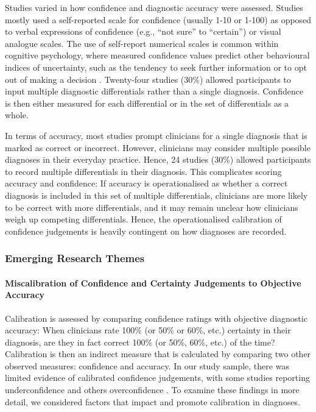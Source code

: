 \documentclass[a4paper, nobind]{templates/ociamthesis}
\begin{document}
\hfill\break
Studies varied in how confidence and diagnostic accuracy were assessed. Studies mostly used a self-reported scale for confidence (usually 1-10 or 1-100) as opposed to verbal expressions of confidence (e.g., ``not sure'' to ``certain'') or visual analogue scales. The use of self-report numerical scales is common within cognitive psychology, where measured confidence values predict other behavioural indices of uncertainty, such as the tendency to seek further information or to opt out of making a decision \autocite{gherman_neural_2015}. Twenty-four studies (30\%) allowed participants to input multiple diagnostic differentials rather than a single diagnosis. Confidence is then either measured for each differential or in the set of differentials as a whole.

\hfill\break
In terms of accuracy, most studies prompt clinicians for a single diagnosis that is marked as correct or incorrect. However, clinicians may consider multiple possible diagnoses in their everyday practice. Hence, 24 studies (30\%) allowed participants to record multiple differentials in their diagnosis. This complicates scoring accuracy and confidence: If accuracy is operationalised as whether a correct diagnosis is included in this set of multiple differentials, clinicians are more likely to be correct with more differentials, and it may remain unclear how clinicians weigh up competing differentials. Hence, the operationalised calibration of confidence judgements is heavily contingent on how diagnoses are recorded.

\subsubsection{Emerging Research Themes}\label{emerging-research-themes}

\paragraph{Miscalibration of Confidence and Certainty Judgements to Objective Accuracy}\label{miscalibration-of-confidence-and-certainty-judgements-to-objective-accuracy}

Calibration is assessed by comparing confidence ratings with objective diagnostic accuracy: When clinicians rate 100\% (or 50\% or 60\%, etc.) certainty in their diagnosis, are they in fact correct 100\% (or 50\%, 60\%, etc.) of the time? Calibration is then an indirect measure that is calculated by comparing two other observed measures: confidence and accuracy. In our study sample, there was limited evidence of calibrated confidence judgements, with some studies reporting underconfidence \autocite{mann_relationship_1993,yang_effect_2012,brezis_does_2019}and others overconfidence \autocite{friedman_are_2001,fernandez-aguilar_use_2022,garbayo_metacognitive_2023}. To examine these findings in more detail, we considered factors that impact and promote calibration in diagnoses.
\end{document}
